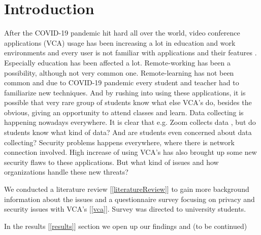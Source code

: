 \documentclass[utf8,english]{gradu3}
\begin{document}

\mainmatter


\sloppypar 



\chapter{Introduction}
\label{introduction}
After the COVID-19 pandemic hit hard all over the world, video conference applications (VCA) usage has been increasing a lot in education and work environments and every user is not familiar with applications and their features \parencite{zsolt2020}. Especially education has been affected a lot. Remote-working has been a possibility, although not very common one. Remote-learning has not been common and due to COVID-19 pandemic every student and teacher had to familiarize new techniques. And by rushing into using these applications, it is possible that very rare group of students know what else VCA's do, besides the obvious, giving an opportunity to attend classes and learn. Data collecting is happening nowadays everywhere. It is clear that e.g. Zoom collects data \parencite{zoomdata}, but do students know what kind of data? And are students even concerned about data collecting?
Security problems happens everywhere, where there is network connection involved. High increase of using VCA's has also brought up some new security flaws to these applications. But what kind of issues and how organizations handle these new threats?
%

We conducted a literature review [\ref{literatureReview}] to gain more background information about the issues and a questionnaire survey focusing on privacy and security issues with VCA's [\ref{vca}]. Survey was directed to university students.
%

%
In the results [\ref{results}] section we open up our findings and (to be continued)
\end{document}
